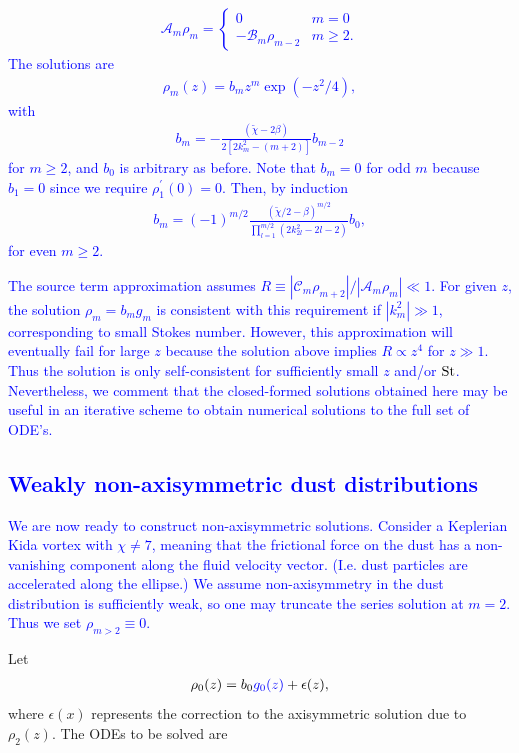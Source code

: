 \documentclass[apj]{emulateapj}
\def\blue#1{\textcolor{blue}{#1}}
\newcommand{\tilchi}{\tilde\chi}
\newcommand{\St}{{\rm St}}
\begin{document}
\blue{
\begin{align}
\mathcal{A}_m\rho_m = \begin{cases}
        0 & m =0 \\
	-\mathcal{B}_m\rho_{m-2} & m \geq 2.
\end{cases}
\end{align}
The solutions are 
\begin{align}\label{eq:series}
\rho_m (z)= b_m z^m\exp{(-z^2/4)}, 
\end{align}
with
\begin{align}
b_m  = -\frac{\left(\tilchi - 2\beta\right)}{2\left[2k_m^2 - (m+2)\right]}b_{m-2}
\end{align}
for $m\geq2$, and $b_0$ is arbitrary as before. Note that $b_m=0$ for odd $m$ because $b_1=0$ since 
we require $\rho_1^\prime(0)=0$. Then, by induction 
\begin{align}\label{eq:induction}
b_m  = \left(-1\right)^{m/2}\frac{\left(\tilchi/2-\beta\right)^{m/2}}{\prod_{l=1}^{m/2}
\left(2k_{2l}^2 -2l - 2\right)}b_0,
\end{align}
for even $m\geq 2$.  
}

\blue{
The source term approximation assumes 
$R\equiv|\mathcal{C}_m\rho_{m+2}|/|\mathcal{A}_m\rho_m| \ll 1.$ 
For given $z$, the solution $\rho_m=b_mg_m$ is consistent with this requirement if $|k_m^2|\gg1$, corresponding to small Stokes number.  
 However, this approximation will eventually fail for large $z$ because the solution above implies $R\propto z^4$ for $z\gg1$. Thus the solution is only self-consistent for sufficiently small $z$ and/or $\St$. Nevertheless,
we comment that the closed-formed solutions obtained here may be useful in
an iterative scheme to obtain numerical solutions to the full set of ODE's. 
}

\blue{
\subsection{Weakly non-axisymmetric dust distributions}
We are now ready to construct non-axisymmetric solutions. 
Consider a Keplerian Kida vortex with $\chi\neq 7$, meaning that the
frictional force on the dust has a non-vanishing component along the
fluid velocity vector. (I.e. dust particles are accelerated along the
ellipse.) We assume non-axisymmetry in the dust distribution is
sufficiently weak, so one may truncate the series solution at
$m=2$. Thus we set $\rho_{m>2}\equiv0$.} Let
\begin{align}
\rho_0(z) = b_0\blue{g_0(z)} + \epsilon(z),
\end{align}
where $\epsilon(x)$ represents the correction to the axisymmetric
solution due to $\rho_2(z)$. The ODEs to be solved are
\end{document}
